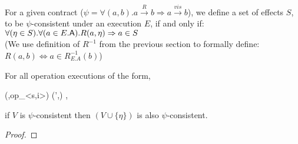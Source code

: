 %
%
\begin{definition}
For a given contract ($\psi=\forall(a,b). a
\xrightarrow{R} b \Rightarrow a \xrightarrow{vis} b $), we define a set
of effects $S$, to be  $\psi$-consistent under an execution $E$, if and
only if: 
$\forall (\eta \in S). \forall(a\in E.{\normalfont \textsf{A}}). R(a,\eta)
\Rightarrow a \in S$ 
\\(We use definition of $R^{-1}$ from the previous section to formally
define: $R(a,b) \iff a \in R_{E.A}^{-1}(b)  $)
\end{definition}

\begin{theorem}
For all operation executions of the form,  
\begin{smathpar}
(\E,op_{<s,i>}) 
    \;\;
  (\E',\eff) 
,\end{smathpar}

if $V$ is $\psi$-consistent then $(V\cup\{\eta\})$ is also
$\psi$-consistent.
\begin{proof}

\end{proof}
\end{theorem}






